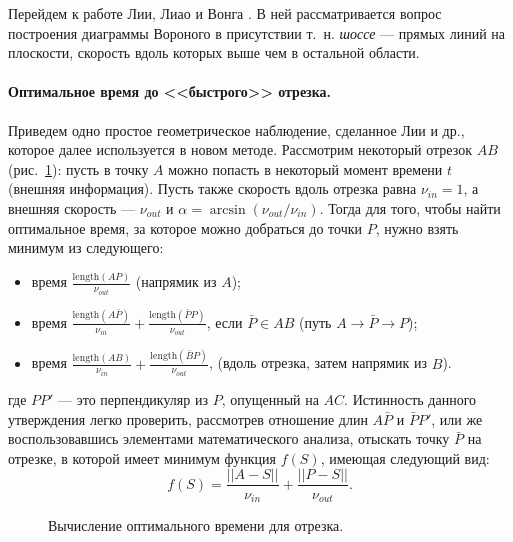 \documentclass[12pt]{article}
\begin{document}
Перейдем к работе Лии, Лиао и Вонга \cite{distmap}. В ней рассматривается
вопрос построения диаграммы Вороного в присутствии т.~н. \emph{шоссе} ---
прямых линий на плоскости, скорость вдоль которых выше чем в остальной области.

\paragraph{Оптимальное время до <<быстрого>> отрезка.}\label{segopt}
Приведем одно простое геометрическое наблюдение, сделанное Лии и др.,
которое далее используется в новом методе. Рассмотрим некоторый отрезок
$AB$ (рис.~\ref{fig_segopt}): пусть в точку $A$ можно попасть в некоторый
момент времени $t$ (внешняя информация). Пусть также скорость вдоль отрезка 
равна $\nu_{in} = 1$, а внешняя скорость --- $\nu_{out}$ и
$\alpha = \arcsin(\nu_{out} / \nu_{in})$. Тогда для того, чтобы найти 
оптимальное время, за которое можно добраться до точки $P$, нужно
взять минимум из следующего:
\begin{itemize}
\item время $\frac{\mathrm{length}(AP)}{\nu_{out}}$ (напрямик из $A$);
\item время $\frac{\mathrm{length}(A\bar{P})}{\nu_{in}} + \frac{\mathrm{length}(\bar{P}P)}{\nu_{out}}$, 
если $\bar{P} \in AB$ (путь $A \to \bar{P} \to P$);
\item время $\frac{\mathrm{length}(AB)}{\nu_{in}} + \frac{\mathrm{length}(\bar{B}P)}{\nu_{out}}$,
(вдоль отрезка, затем напрямик из $B$).
\end{itemize}
где $PP'$ --- это перпендикуляр из $P$, опущенный на $AC$. 
Истинность данного утверждения легко проверить, рассмотрев
отношение длин $A\bar{P}$ и $\bar{P}P'$, или же воспользовавшись
элементами математического анализа, отыскать точку $\bar{P}$ на отрезке,
в которой имеет минимум функция $f(S)$, имеющая следующий вид:
$$
f(S) = \frac{||A - S||}{\nu_{in}} + \frac{||P - S||}{\nu_{out}}.
$$
\begin{figure}
\begin{center}
\end{center}
\caption{Вычисление оптимального времени для отрезка.}
\label{fig_segopt}
\end{figure}
\end{document}
